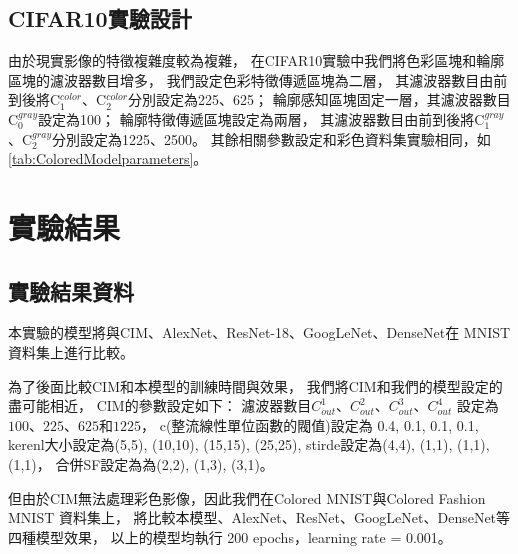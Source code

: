 \documentclass[class=NCU\_thesis, crop=false]{standalone}
\begin{document}
    \subsection{CIFAR10實驗設計}
    由於現實影像的特徵複雜度較為複雜，
    在CIFAR10實驗中我們將色彩區塊和輪廓區塊的濾波器數目增多，
    我們設定色彩特徵傳遞區塊為二層，
    其濾波器數目由前到後將C$^{color}_{1}$、C$^{color}_{2}$分別設定為225、625；
    輪廓感知區塊固定一層，其濾波器數目C$^{gray}_{0}$設定為100；
    輪廓特徵傳遞區塊設定為兩層，
    其濾波器數目由前到後將C$^{gray}_{1}$、C$^{gray}_{2}$分別設定為1225、2500。
    其餘相關參數設定和彩色資料集實驗相同，如\cref{tab:ColoredModelparameters}。

\section{實驗結果}
    \subsection{實驗結果資料}
    本實驗的模型將與CIM、AlexNet\cite{NIPS2012_c399862d}、ResNet-18\cite{He_2016_CVPR}、GoogLeNet\cite{Szegedy_2015_CVPR}、DenseNet\cite{Huang_2017_CVPR}在 MNIST 資料集上進行比較。

    為了後面比較CIM和本模型的訓練時間與效果，
    我們將CIM和我們的模型設定的盡可能相近，
    CIM的參數設定如下：
    濾波器數目$C^{1}_{out}$、$C^{2}_{out}$、$C^{3}_{out}$、$C^{4}_{out}$ 設定為$100$、$225$、$625$和$1225$，
    c(整流線性單位函數的閥值)設定為 0.4, 0.1, 0.1, 0.1,
    kerenl大小設定為(5,5), (10,10), (15,15), (25,25), 
    stirde設定為(4,4), (1,1), (1,1), (1,1)，
    合併SF設定為為(2,2), (1,3), (3,1)。

    但由於CIM無法處理彩色影像，因此我們在Colored MNIST與Colored Fashion MNIST 資料集上，
    將比較本模型、AlexNet、ResNet、GoogLeNet、DenseNet等四種模型效果，
    以上的模型均執行 200 epochs，learning rate = 0.001。
\end{document}
